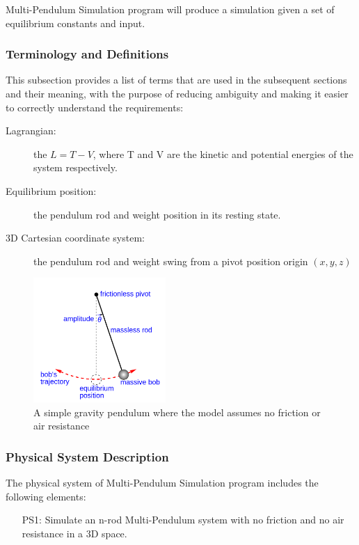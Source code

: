 \documentclass[12pt]{article}
\begin{document}
Multi-Pendulum Simulation program will produce a simulation given a set of equilibrium constants and input. 

\subsubsection{Terminology and Definitions}

This subsection provides a list of terms that are used in the subsequent
sections and their meaning, with the purpose of reducing ambiguity and making it
easier to correctly understand the requirements:

\begin{description}
\item[Lagrangian:] the $L=T-V$, where T and V are the kinetic and potential energies of the system respectively.
\item[Equilibrium position:] the pendulum rod and weight position in its resting state.
\item[3D Cartesian coordinate system:] the pendulum rod and weight swing from a pivot position origin $(x,y,z)$
\end{description}

\begin{figure}[H]
	\centering
	\includegraphics[width=190px]{simple-pend.png}
	\caption{A simple gravity pendulum where the model assumes no friction or air resistance}
	\label{fig:maxresdefault}
\end{figure}

\subsubsection{Physical System Description}

The physical system of Multi-Pendulum Simulation program includes the following elements:

\begin{itemize}
\item[PS1:] Simulate an n-rod Multi-Pendulum system with no friction and no air resistance in a 3D space.
\end{itemize}
\end{document}
